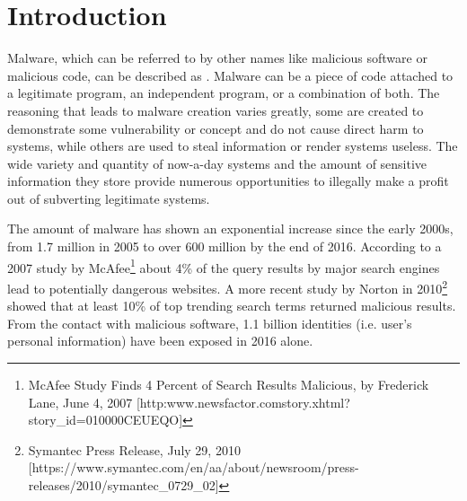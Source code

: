 \documentclass{llncs}
\begin{document}
\mainmatter


\section{Introduction}\label{sec:introduction}
Malware, which can be referred to by other names like malicious software or malicious code, can be described as \cite{mcgraw:mal_code}. Malware can be a piece of code attached to a legitimate program, an independent program, or a combination of both. The reasoning that leads to malware creation varies greatly, some are created to demonstrate some vulnerability or concept and do not cause direct harm to systems, while others are used to steal information or render systems useless. The wide variety and quantity of now-a-day systems and the amount of sensitive information they store provide numerous opportunities to illegally make a profit out of subverting legitimate systems.

The amount of malware has shown an exponential increase since the early 2000s, from 1.7 million in 2005 to over 600 million by the end of 2016\cite{av-test:report,mcafee:report}. According to a 2007 study by McAfee\footnote{McAfee Study Finds 4 Percent of Search Results Malicious, by Frederick Lane, June 4, 2007 [http:\/\/www.newsfactor.com\/story.xhtml?story\_id=010000CEUEQO]} about 4\% of the query results by major search engines lead to potentially dangerous websites. A more recent study by Norton in 2010\footnote{Symantec Press Release, July 29, 2010 [https://www.symantec.com/en/aa/about/newsroom/press-releases/2010/symantec\_0729\_02]} showed that at least 10\% of top trending search terms returned malicious results. From the contact with malicious software, 1.1 billion identities (i.e. user's personal information) have been exposed in 2016 alone\cite{symantec:report}.
\end{document}
